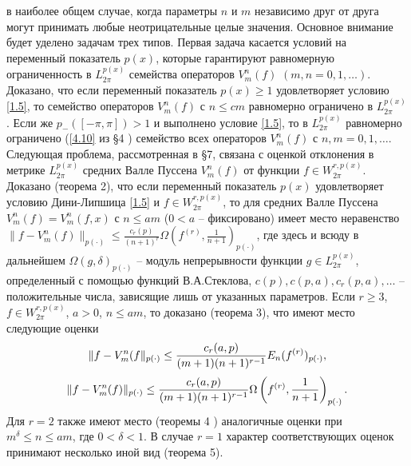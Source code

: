  в наиболее общем случае, когда параметры $n$   и $m$ независимо друг от друга могут принимать любые неотрицательные целые значения.
Основное внимание будет уделено задачам трех типов. Первая задача касается условий на переменный показатель $p(x)$, которые гарантируют  равномерную ограниченность в $L_{2\pi}^{p(x)}$ семейства операторов  $V_m^n(f)$ $(m,n=0,1,\ldots)$. Доказано, что если переменный показатель $p(x)\ge1$ удовлетворяет условию \eqref{1.5}, то семейство операторов  $V_m^n(f)$ с $n\le cm$ равномерно ограничено в $L_{2\pi}^{p(x)}$. Если же $p_-([-\pi,\pi])>1$ и выполнено условие \eqref{1.5}, то  в $L_{2\pi}^{p(x)}$ равномерно ограничено (\eqref{4.10} из \S4 ) семейство всех операторов  $V_m^n(f)$ с $n,m=0,1,\ldots$. Следующая проблема, рассмотренная в \S7, связана с оценкой отклонения в метрике  $L_{2\pi}^{p(x)}$
средних Валле Пуссена $V_m^n(f)$  от функции $f\in W_{2\pi}^{r,p(x)}$. Доказано (теорема 2), что если переменный показатель $p(x)$ удовлетворяет условию Дини-Липшица \eqref{1.5} и $f\in W^{r,p(x)}_{2\pi}$,
то для средних Валле  Пуссена $V_m^n(f)=V_m^n(f,x)$ с $ n\le am$ ($0<a$ -- фиксировано) имеет место неравенство
 $\|f-V_m^n(f)\|_{p(\cdot)}\le \frac{c_r(p)}{(n+1)^r}\Omega(f^{(r)},\frac1{n+1})_{p(\cdot)}$,  где здесь и всюду в дальнейшем $\Omega(g,\delta)_{p(\cdot)}$ -- модуль непрерывности функции $g\in L^{p(x)}_{2\pi}$, определенный с помощью функций В.А.Стеклова, $c(p), c(p,a), c_r(p,a),\ldots $ -- положительные числа, зависящие лишь от указанных параметров.
 Если  $r\ge3$, $f\in W^{r,p(x)}_{2\pi}$, $a>0$, $ n\le am$, то доказано (теорема 3), что имеют место следующие оценки
\begin{equation*}
   \|f-V_m^n(f\|_{p(\cdot)}\le {c_r(a,p)\over(m+1) (n+1)^{r-1}}E_n(f^{(r)})_{p(\cdot)},
\end{equation*}
\begin{equation*}
   \|f-V_m^n(f)\|_{p(\cdot)}\le {c_r(a,p)\over(m+1) (n+1)^{r-1}}\Omega\left(f^{(r)},\frac1{n+1}\right)_{p(\cdot)}.
\end{equation*}
Для $r=2$ также имеют место (теоремы 4 ) аналогичные оценки при $m^\delta\le n\le am$, где $0<\delta<1$.
В случае $r=1$  характер соответствующих оценок принимают несколько иной вид (теорема 5).

